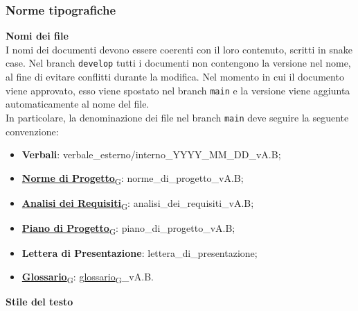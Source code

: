 \subsubsection{Norme tipografiche}
\textbf{Nomi dei file}\\ I nomi dei documenti devono essere coerenti con il loro contenuto,
scritti in snake case. Nel branch \texttt{develop} tutti i documenti non contengono la versione nel nome, al fine di evitare conflitti durante la modifica.
Nel momento in cui il documento viene approvato, esso viene spostato nel branch \texttt{main} e la versione viene aggiunta automaticamente al nome del file.\\
In particolare, la denominazione dei file nel branch \texttt{main} deve seguire la seguente convenzione:
\begin{itemize}
	\item \textbf{Verbali}: verbale\_esterno/interno\_YYYY\_MM\_DD\_vA.B;
	\item \href{https://7last.github.io/docs/pb/documentazione-interna/glossario\#norme-di-progetto}{\textbf{Norme di Progetto}\textsubscript{G}}: norme\_di\_progetto\_vA.B;
	\item \href{https://7last.github.io/docs/pb/documentazione-interna/glossario\#analisi-dei-requisiti}{\textbf{Analisi dei Requisiti}\textsubscript{G}}: analisi\_dei\_requisiti\_vA.B;
	\item \href{https://7last.github.io/docs/pb/documentazione-interna/glossario\#piano-di-progetto}{\textbf{Piano di Progetto}\textsubscript{G}}: piano\_di\_progetto\_vA.B;
	\item \textbf{Lettera di Presentazione}: lettera\_di\_presentazione;
	\item \href{https://7last.github.io/docs/pb/documentazione-interna/glossario\#glossario}{\textbf{Glossario}\textsubscript{G}}: \href{https://7last.github.io/docs/pb/documentazione-interna/glossario\#glossario}{glossario\textsubscript{G}}\_vA.B.
\end{itemize}
\textbf{Stile del testo}
